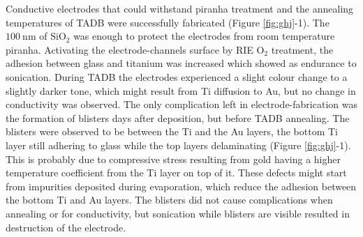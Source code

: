 \documentclass[final]{jyflluk}
\begin{document}
Conductive electrodes that could withstand piranha treatment and the annealing temperatures of TADB were successfully fabricated (Figure \ref{fig:ghj}-1). The $\SI{100}{\nano \metre}$ of $\mathrm{SiO_2}$ was enough to protect the electrodes from room temperature piranha. Activating the electrode-channels surface by RIE $\mathrm{O_2}$ treatment, the adhesion between glass and titanium was increased which showed as endurance to sonication. During TADB the electrodes experienced a slight colour change to a slightly darker tone, which might result from Ti diffusion to Au, but no change in conductivity was observed. The only complication left in electrode-fabrication was the formation of blisters days after deposition, but before TADB annealing.  The blisters were observed to be between the Ti and the Au layers, the bottom Ti layer still adhering to glass while the top layers delaminating (Figure \ref{fig:ghj}-1). This is probably due to compressive stress resulting from gold having a higher temperature coefficient from the Ti layer on top of it. These defects might start from impurities deposited during evaporation, which reduce the adhesion between the bottom Ti and Au layers. The blisters did not cause complications when annealing or for conductivity, but sonication while blisters are visible resulted in destruction of the electrode.
\end{document}

